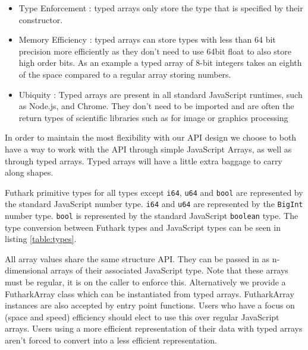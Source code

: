 \documentclass[11pt]{book}
\begin{document}
\begin{itemize}
    \item Type Enforcement : typed arrays only store the type that is specified by their constructor. 
    \item Memory Efficiency : typed arrays can store types with less than 64 bit precision more efficiently as they don't need to use 64bit float to also store high order bits. As an example a typed array of 8-bit integers takes an eighth of the space compared to a regular array storing numbers.
    \item Ubiquity : Typed arrays are present in all standard JavaScript runtimes, such as Node.js, and Chrome. They don't need to be imported and are often the return types of scientific libraries such as for image or graphics processing
\end{itemize}


In order to maintain the most flexibility with our API design we choose to both have a way to work with the API through simple JavaScript Arrays, as well as through typed arrays. Typed arrays will have a little extra baggage to carry along shapes.




Futhark primitive types for all types except \texttt{i64}, \texttt{u64} and \texttt{bool} are represented by the standard JavaScript number type. \texttt{i64} and \texttt{u64} are represented by the \texttt{BigInt} number type. \texttt{bool} is represented by the standard JavaScript \texttt{boolean} type. The type conversion between Futhark types and JavaScript types can be seen in listing \ref{table:types}.

All array values share the same structure API. They can be passed in as n-dimensional arrays of their associated JavaScript type. Note that these arrays must be regular, it is on the caller to enforce this.
Alternatively we provide a FutharkArray class which can be instantiated from typed arrays. FutharkArray instances are also accepted by entry point functions. Users who have a focus on (space and speed) efficiency should elect to use this over regular JavaScript arrays. Users using a more efficient representation of their data with typed arrays aren't forced to convert into a less efficient representation. 
\end{document}

